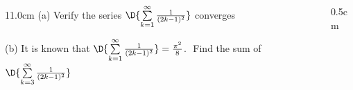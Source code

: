 \begin{frame}
\frametitle{}
\scriptsize

\vspace{0.2cm}

\begin{columns}
\begin{column}{11.0cm}
(a) Verify the series \quad $\D{\sum \limits_{k=1}^{\infty} \frac{1}{(2k-1)^2}}$ \quad converges\\

\vspace{4.0cm}

(b) It is known that $\D{\sum \limits_{k=1}^{\infty} \frac{1}{(2k-1)^2}} = \frac{\pi^2}{8}$.  \,\,Find the sum of \quad $\D{\sum \limits_{k=3}^{\infty} \frac{1}{(2k-1)^2}}$

\vspace{6.5cm}

\end{column}
\begin{column}{0.5cm}
	
\end{column}
\end{columns}
\end{frame}
